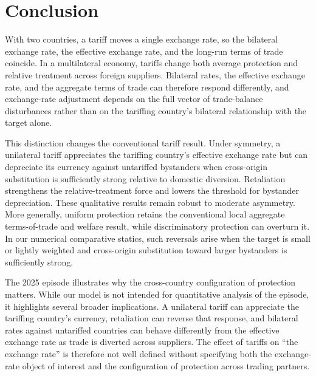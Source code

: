 \section{Conclusion}
\label{sec:conclusion}

With two countries, a tariff moves a single exchange rate, so the bilateral exchange rate, the effective exchange rate, and the long-run terms of trade coincide. In a multilateral economy, tariffs change both average protection and relative treatment across foreign suppliers. Bilateral rates, the effective exchange rate, and the aggregate terms of trade can therefore respond differently, and exchange-rate adjustment depends on the full vector of trade-balance disturbances rather than on the tariffing country's bilateral relationship with the target alone.

This distinction changes the conventional tariff result. Under symmetry, a unilateral tariff appreciates the tariffing country's effective exchange rate but can depreciate its currency against untariffed bystanders when cross-origin substitution is sufficiently strong relative to domestic diversion. Retaliation strengthens the relative-treatment force and lowers the threshold for bystander depreciation. These qualitative results remain robust to moderate asymmetry. More generally, uniform protection retains the conventional local aggregate terms-of-trade and welfare result, while discriminatory protection can overturn it. In our numerical comparative statics, such reversals arise when the target is small or lightly weighted and cross-origin substitution toward larger bystanders is sufficiently strong.

The 2025 episode illustrates why the cross-country configuration of protection matters. While our model is not intended for quantitative analysis of the episode, it highlights several broader implications. A unilateral tariff can appreciate the tariffing country's currency, retaliation can reverse that response, and bilateral rates against untariffed countries can behave differently from the effective exchange rate as trade is diverted across suppliers. The effect of tariffs on ``the exchange rate'' is therefore not well defined without specifying both the exchange-rate object of interest and the configuration of protection across trading partners.
